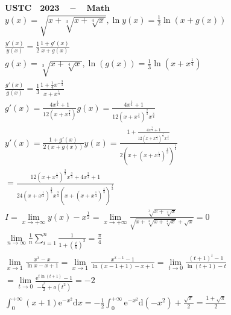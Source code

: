 \documentclass{article}
\begin{document}
\begin{align*}
    \mathbf{USTC \quad 2023 \quad - \quad Math} \\
    y(x) = \sqrt{x+\sqrt[3]{x+\sqrt[4]{x}}} ,\ln y(x) = \frac{1}{2}\ln\left(x+g(x)\right)\\
    \frac{y'(x)}{y(x)} = \frac{1}{2}\frac{1+g'(x)}{x+g(x)} \\
    g(x) = \sqrt[3]{x+\sqrt[4]{x}},\ln\left(g(x)\right) = \frac{1}{3}\ln\left(x+x^{\frac{1}{4}}\right)\\
    \frac{g'(x)}{g(x)} = \frac{1}{3} \frac{1+\frac{1}{4}x^{-\frac{3}{4}}}{x+x^{\frac{1}{4}}} \\
    g'(x) = \frac{4x^{\frac{3}{4}}+1}{12(x+x^{\frac{7}{4}})}g(x)=\frac{4x^{\frac{3}{4}}+1}{12(x+x^{\frac{1}{4}})^{\frac{2}{3}}x^{\frac{3}{4}}} \\
    y'(x) = \frac{1+g'(x)}{2(x+g(x))}y(x) = \frac{1+\frac{4x^{\frac{3}{4}}+1}{12(x+x^{\frac{1}{4}})^{\frac{2}{3}}x^{\frac{3}{4}}}}{2(x+(x+x^{\frac{1}{4}})^{\frac{1}{3}})^{\frac{1}{2}}} \\ 
    = \frac{12(x+x^{\frac{1}{4}})^{\frac{2}{3}}x^{\frac{3}{4}}+4x^{\frac{3}{4}}+1}{24(x+x^{\frac{1}{4}})^{\frac{2}{3}}x^{\frac{3}{4}}(x+(x+x^{\frac{1}{4}})^{\frac{1}{3}})^{\frac{1}{2}}} \\ 
    I = \lim_{x \to +\infty} y(x)-x^{\frac{1}{2}} = \lim_{x \to +\infty} \frac{\sqrt[3]{x+\sqrt[4]{x}}}{\sqrt{x+\sqrt[3]{x+\sqrt[4]{x}}}+\sqrt{x}} = 0 \\ 
    \lim_{n \to \infty}  \frac{1}{n} \sum_{i=1}^{n} \frac{1}{1+\left(\frac{i}{n}\right)^2} = \frac{\pi}{4}  \\
    \lim_{x \to 1} \frac{x^{x}-x}{\ln x-x +1} = \lim_{ x \to 1} \frac{x^{x-1}-1}{\ln(x-1 + 1)-x+1} = \lim_{t \to 0}\frac{(t+1)^{t}-1}{\ln (t+1)-t} \\ 
    = \lim_{t \to 0}\frac{\mathrm{e}^{t\ln(t+1)}-1}{-\frac{t^2}{2}+o(t^2)} = -2\\ 
    \int_{0}^{+\infty} (x+1)\mathrm{e}^{-x^2}\mathrm{d}x = -\frac{1}{2}\int_{0}^{+\infty} \mathrm{e}^{-x^2}\mathrm{d}(-x^2) + \frac{\sqrt{\pi}}{2} = \frac{1+\sqrt{\pi}}{2}
\end{align*}

\clearpage 
\end{document}
